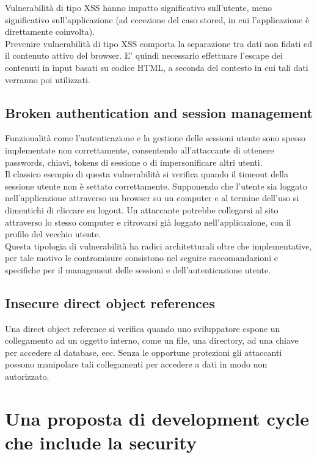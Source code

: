 Vulnerabilità di tipo XSS hanno impatto significativo sull'utente, meno significativo sull'applicazione (ad eccezione del caso stored, in cui l'applicazione è direttamente coinvolta).\\
Prevenire vulnerabilità di tipo XSS comporta la separazione tra dati non fidati ed il contenuto attivo del browser. E' quindi necessario effettuare l'escape dei contenuti in input basati su codice HTML, a seconda del contesto in cui tali dati verranno poi utilizzati.

\subsection{Broken authentication and session management}
Funzionalità come l'autenticazione e la gestione delle sessioni utente sono spesso implementate non correttamente, consentendo all'attaccante di ottenere passwords, chiavi, tokens di sessione o di impersonificare altri utenti.\\
Il classico esempio di questa vulnerabilità si verifica quando il timeout della sessione utente non è settato correttamente. Supponendo che l'utente sia loggato nell'applicazione attraverso un browser su un computer e al termine dell'uso si dimentichi di cliccare su logout. Un attaccante potrebbe collegarsi al sito attraverso lo stesso computer e ritrovarsi già loggato nell'applicazione, con il profilo del vecchio utente. \\
Questa tipologia di vulnerabilità ha radici architetturali oltre che implementative, per tale motivo le contromisure consistono nel seguire raccomandazioni e specifiche per il management delle sessioni e dell'autenticazione utente.

\subsection{Insecure direct object references}
Una direct object reference si verifica quando uno sviluppatore espone un collegamento ad un oggetto interno, come un file, una directory, ad una chiave per accedere al database, ecc. Senza le opportune protezioni gli attaccanti possono manipolare tali collegamenti per accedere a dati in modo non autorizzato.\\


\section{Una proposta di development cycle che include la security}

